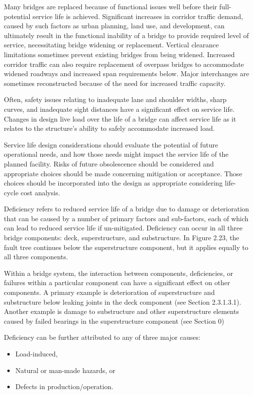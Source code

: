 Many bridges are replaced because of functional issues well before their full-potential service life is achieved. Significant increases in corridor traffic demand, caused by such factors as urban planning, land use, and development, can ultimately result in the functional inability of a bridge to provide required level of service, necessitating bridge widening or replacement. Vertical clearance limitations sometimes prevent existing bridges from being widened. Increased corridor traffic can also require replacement of overpass bridges to accommodate widened roadways and increased span requirements below. Major interchanges are sometimes reconstructed because of the need for increased traffic capacity.

Often, safety issues relating to inadequate lane and shoulder widths, sharp curves, and inadequate sight distances have a significant effect on service life. Changes in design live load over the life of a bridge can affect service life as it relates to the structure’s ability to safely accommodate increased load.

Service life design considerations should evaluate the potential of future operational needs, and how those needs might impact the service life of the planned facility. Risks of future obsolescence should be considered and appropriate choices should be made concerning mitigation or acceptance. Those choices should be incorporated into the design as appropriate considering life-cycle cost analysis.

Deficiency refers to reduced service life of a bridge due to damage or deterioration that can be caused by a number of primary factors and sub-factors, each of which can lead to reduced service life if un-mitigated. Deficiency can occur in all three bridge components: deck, superstructure, and substructure. In Figure 2.23, the fault tree continues below the superstructure component, but it applies equally to all three components.

Within a bridge system, the interaction between components, deficiencies, or failures within a particular component can have a significant effect on other components. A primary example is deterioration of superstructure and substructure below leaking joints in the deck component (see Section 2.3.1.3.1). Another example is damage to substructure and other superstructure elements caused by failed bearings in the superstructure component (see Section 0)

Deficiency can be further attributed to any of three major causes:
\begin{itemize}
  \item Load-induced,
  \item Natural or man-made hazards, or
  \item Defects in production/operation.
\end{itemize}

